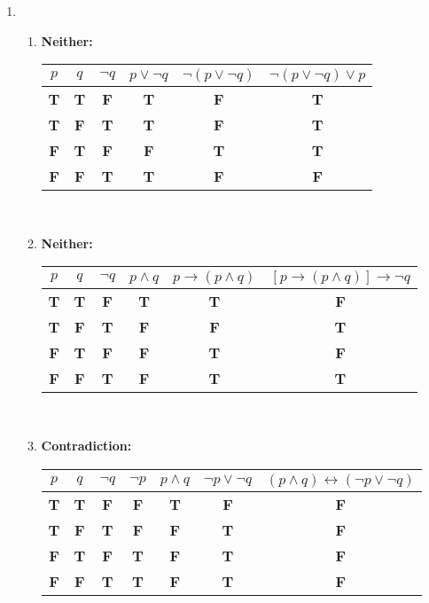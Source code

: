 \begin{enumerate}[leftmargin=2cm,labelsep=.5cm,label=\bf\arabic*.]
\item
\begin{enumerate}
  \item \textbf{Neither:}\\ \begin{tabu}[t]{|c|c|c|c|c|c|}
\hline
$p$ & $q$ & $\neg q$ & $p\vee\neg q$ & $\neg(p\vee\neg q)$ & $\neg(p\vee\neg q)\vee p$ \\ \hline
\textbf{T} & \textbf{T} & \textbf{F} & \textbf{T} & \textbf{F} & \textbf{T} \\ \hline
\textbf{T} & \textbf{F} & \textbf{T} & \textbf{T} & \textbf{F} & \textbf{T} \\ \hline
\textbf{F} & \textbf{T} & \textbf{F} & \textbf{F} & \textbf{T} & \textbf{T} \\ \hline
\textbf{F} & \textbf{F} & \textbf{T} & \textbf{T} & \textbf{F} & \textbf{F} \\ \hline
\end{tabu}\\[2mm]

  \item \textbf{Neither:}\\
  \begin{tabu}[t]{|c|c|c|c|c|c|}
\hline
$p$ & $q$ & $\neg q$ & $p\wedge q$ & $p\rightarrow (p\wedge q)$ & $[p\rightarrow (p\wedge q)]\rightarrow \neg q$ \\ \hline
\textbf{T} & \textbf{T} & \textbf{F} & \textbf{T} & \textbf{T} & \textbf{F} \\ \hline
\textbf{T} & \textbf{F} & \textbf{T} & \textbf{F} & \textbf{F} & \textbf{T} \\ \hline
\textbf{F} & \textbf{T} & \textbf{F} & \textbf{F} & \textbf{T} & \textbf{F} \\ \hline
\textbf{F} & \textbf{F} & \textbf{T} & \textbf{F} & \textbf{T} & \textbf{T} \\ \hline
\end{tabu}\\[2mm]

  \item \textbf{Contradiction:}\\
  \begin{tabu}[t]{|c|c|c|c|c|c|c|}
\hline
$p$ & $q$ & $\neg q$ & $\neg p$ & $p\wedge q$ & $\neg p\vee\neg q$ & $(p\wedge q)\leftrightarrow (\neg p\vee\neg q)$ \\ \hline
\textbf{T} & \textbf{T} & \textbf{F} & \textbf{F} & \textbf{T} & \textbf{F} & \textbf{F} \\ \hline
\textbf{T} & \textbf{F} & \textbf{T} & \textbf{F} & \textbf{F} & \textbf{T} & \textbf{F} \\ \hline
\textbf{F} & \textbf{T} & \textbf{F} & \textbf{T} & \textbf{F} & \textbf{T} & \textbf{F} \\ \hline
\textbf{F} & \textbf{F} & \textbf{T} & \textbf{T} & \textbf{F} & \textbf{T} & \textbf{F} \\ \hline
\end{tabu}\\[5mm]
\end{enumerate}


\end{enumerate}

